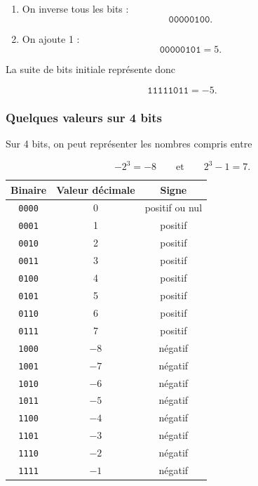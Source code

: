 \documentclass[11pt, a4paper]{book}
\begin{document}
\begin{enumerate}
    \item On inverse tous les bits :
    \[
        \texttt{00000100}.
    \]

    \item On ajoute 1 :
    \[
        \texttt{00000101}=5.
    \]
\end{enumerate}

La suite de bits initiale représente donc

\[
    \texttt{11111011}=-5.
\]

\subsubsection{Quelques valeurs sur 4 bits}

Sur 4 bits, on peut représenter les nombres compris entre

\[
    -2^3=-8
    \qquad\text{et}\qquad
    2^3-1=7.
\]

\begin{center}
\renewcommand{\arraystretch}{1.2}
\begin{tabular}{ccc}
\toprule
\textbf{Binaire} & \textbf{Valeur décimale} & \textbf{Signe} \\
\midrule
\texttt{0000} & 0  & positif ou nul \\
\texttt{0001} & 1  & positif \\
\texttt{0010} & 2  & positif \\
\texttt{0011} & 3  & positif \\
\texttt{0100} & 4  & positif \\
\texttt{0101} & 5  & positif \\
\texttt{0110} & 6  & positif \\
\texttt{0111} & 7  & positif \\
\midrule
\texttt{1000} & $-8$ & négatif \\
\texttt{1001} & $-7$ & négatif \\
\texttt{1010} & $-6$ & négatif \\
\texttt{1011} & $-5$ & négatif \\
\texttt{1100} & $-4$ & négatif \\
\texttt{1101} & $-3$ & négatif \\
\texttt{1110} & $-2$ & négatif \\
\texttt{1111} & $-1$ & négatif \\
\bottomrule
\end{tabular}
\end{center}
\end{document}
